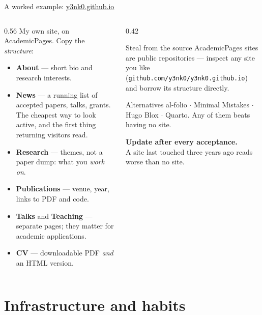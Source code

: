 \documentclass[aspectratio=169,11pt]{beamer}
\newcommand{\code}[1]{\texttt{\small #1}}
\newcommand{\lnk}[2]{\href{#1}{\color{brandlight}\underline{#2}}}
\newcommand{\key}[1]{\textbf{\color{brand}#1}}
\begin{document}
\begin{frame}{A worked example: \lnk{https://y3nk0.github.io}{y3nk0.github.io}}
\begin{columns}[T]
\begin{column}{0.56\textwidth}
My own site, on AcademicPages. Copy the \emph{structure}:
\footnotesize
\begin{itemize}
  \item \key{About} --- short bio and research interests.
  \item \key{News} --- a running list of accepted papers, talks, grants. The
        cheapest way to look active, and the first thing returning visitors
        read.
  \item \key{Research} --- themes, not a paper dump: what you \emph{work on}.
  \item \key{Publications} --- venue, year, links to PDF and code.
  \item \key{Talks} and \key{Teaching} --- separate pages; they matter for
        academic applications.
  \item \key{CV} --- downloadable PDF \emph{and} an HTML version.
\end{itemize}
\end{column}
\begin{column}{0.42\textwidth}
\begin{block}{Steal from the source}
\footnotesize
AcademicPages sites are public repositories --- inspect any site you like
(\code{github.com/y3nk0/\allowbreak y3nk0.github.io}) and borrow its structure directly.
\end{block}
\begin{block}{Alternatives}
\footnotesize
al-folio $\cdot$ Minimal Mistakes $\cdot$ Hugo Blox $\cdot$ Quarto. Any of them
beats having no site.
\end{block}
\centering\footnotesize
\key{Update after every acceptance.}\\ A site last touched three years ago
reads worse than no site.
\end{column}
\end{columns}
\end{frame}

\section{Infrastructure and habits}
\end{document}
